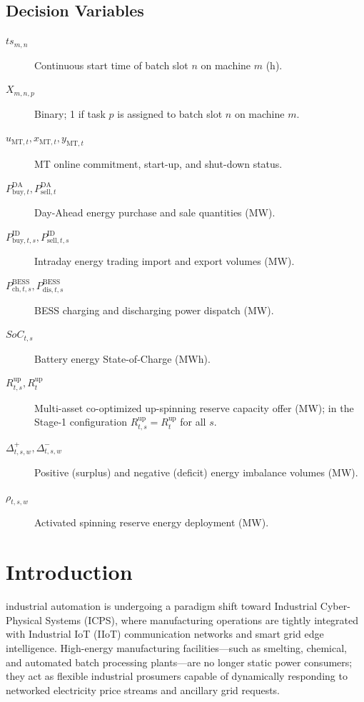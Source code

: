 \documentclass[journal]{IEEEtran}
\begin{document}
\subsection{Decision Variables}
\begin{description}
\item[$ts_{m,n}$] Continuous start time of batch slot $n$ on machine $m$ (h).
\item[$X_{m,n,p}$] Binary; 1 if task $p$ is assigned to batch slot $n$ on machine $m$.
\item[$u_{\text{MT},t}, x_{\text{MT},t}, y_{\text{MT},t}$] MT online commitment, start-up, and shut-down status.
\item[$P_{\text{buy},t}^{\text{DA}}, P_{\text{sell},t}^{\text{DA}}$] Day-Ahead energy purchase and sale quantities (MW).
\item[$P_{\text{buy},t,s}^{\text{ID}}, P_{\text{sell},t,s}^{\text{ID}}$] Intraday energy trading import and export volumes (MW).
\item[$P_{\text{ch},t,s}^{\text{BESS}}, P_{\text{dis},t,s}^{\text{BESS}}$] BESS charging and discharging power dispatch (MW).
\item[$SoC_{t,s}$] Battery energy State-of-Charge (MWh).
\item[$R_{t,s}^{\text{up}}, R_{t}^{\text{up}}$] Multi-asset co-optimized up-spinning reserve capacity offer (MW); in the Stage-1 configuration $R_{t,s}^{\text{up}}=R_{t}^{\text{up}}$ for all $s$.
\item[$\Delta_{t,s,w}^+, \Delta_{t,s,w}^-$] Positive (surplus) and negative (deficit) energy imbalance volumes (MW).
\item[$\rho_{t,s,w}$] Activated spinning reserve energy deployment (MW).
\end{description}

\section{Introduction}
 industrial automation is undergoing a paradigm shift toward Industrial Cyber-Physical Systems (ICPS), where manufacturing operations are tightly integrated with Industrial IoT (IIoT) communication networks and smart grid edge intelligence. High-energy manufacturing facilities---such as smelting, chemical, and automated batch processing plants---are no longer static power consumers; they act as flexible industrial prosumers capable of dynamically responding to networked electricity price streams and ancillary grid requests.
\end{document}
